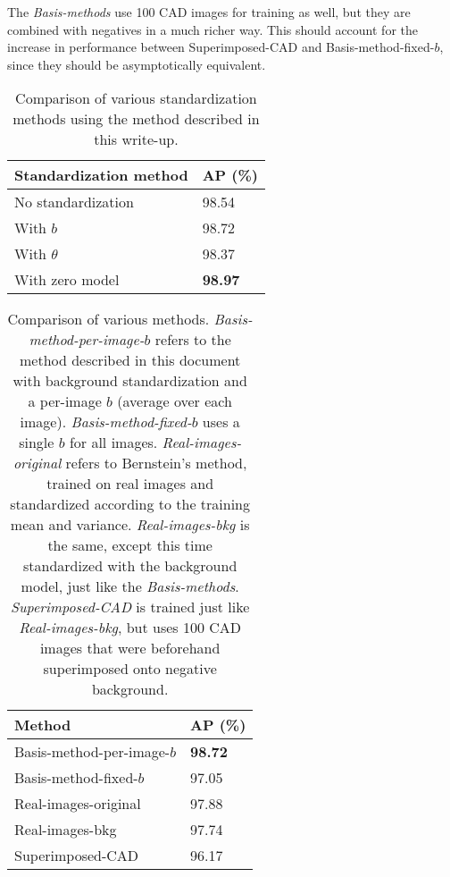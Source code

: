 \documentclass{article}
\begin{document}
The {\em Basis-methods} use 100 CAD images for training as well, but they are combined with negatives in a much richer way. This should account for the increase in performance between Superimposed-CAD and Basis-method-fixed-$b$, since they should be asymptotically equivalent.

\begin{table}
    \centering
    \begin{tabular}{|l|l|}
        \hline
        Standardization method & AP (\%) \\
        \hline 
        No standardization &               98.54 \\
        With $b$     &   98.72 \\
        With $\theta$ &       98.37 \\
        With zero model & \textbf{98.97} \\
        \hline
    \end{tabular}
    \caption{Comparison of various standardization methods using the method described in this write-up.} \label{tab:standardization}
\end{table}

\begin{table}
    \centering
    \begin{tabular}{|l|l|}
        \hline
        Method & AP (\%) \\
        \hline 
        Basis-method-per-image-$b$ & \textbf{98.72} \\
        Basis-method-fixed-$b$ &     97.05 \\
        Real-images-original &              97.88 \\
        Real-images-bkg &              97.74 \\
        Superimposed-CAD &           96.17 \\
        \hline
    \end{tabular}
    \caption{Comparison of various methods. {\em Basis-method-per-image-$b$} refers to the method described in this document with background standardization and a per-image $b$ (average over each image). {\em Basis-method-fixed-$b$} uses a single $b$ for all images. {\em Real-images-original} refers to Bernstein's method, trained on real images and standardized according to the training mean and variance. {\em Real-images-bkg} is the same, except this time standardized with the background model, just like the {\em Basis-methods}. {\em Superimposed-CAD} is trained just like {\em Real-images-bkg}, but uses 100 CAD images that were beforehand superimposed onto negative background.} \label{tab:comp}
\end{table}
\end{document}
